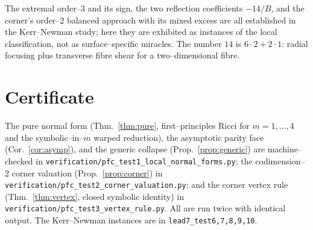 \documentclass[11pt]{article}
\begin{document}
The extremal order--$3$ and its sign, the two reflection coefficients $-14/B$, and the
corner's order--$2$ balanced approach with its mixed excess are all established in the
Kerr--Newman study; here they are exhibited as instances of the local classification, not as
surface--specific miracles. The number $14$ is $6\cdot2+2\cdot1$: radial focusing plus
transverse fibre shear for a two--dimensional fibre.

\section*{Certificate}

The pure normal form (Thm.~\ref{thm:pure}, first--principles Ricci for $m=1,\dots,4$ and the
symbolic--in--$m$ warped reduction), the asymptotic parity face (Cor.~\ref{cor:asymp}), and the
generic collapse (Prop.~\ref{prop:generic}) are machine--checked in
\texttt{verification/pfc\_test1\_local\_normal\_forms.py}; the codimension--$2$ corner
valuation (Prop.~\ref{prop:corner}) in \texttt{verification/pfc\_test2\_corner\_valuation.py};
and the corner vertex rule (Thm.~\ref{thm:vertex}, closed symbolic identity) in
\texttt{verification/pfc\_test3\_vertex\_rule.py}. All are run twice with identical output. The
Kerr--Newman instances are in \texttt{lead7\_test6,7,8,9,10}.
\end{document}
